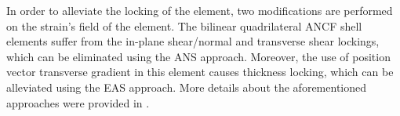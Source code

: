 In order to alleviate the locking of the element, two modifications are performed on the strain's field of the element. The bilinear quadrilateral ANCF shell elements suffer from the in-plane shear/normal and transverse shear lockings, which can be eliminated using the ANS approach. Moreover, the use of position vector transverse gradient in this element causes thickness locking, which can be alleviated using the EAS approach. More details about the aforementioned approaches were provided in \cite{Yamashita2015continuum}.









\pagebreak